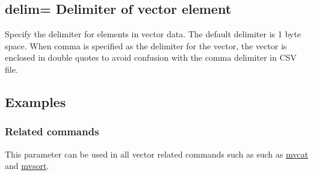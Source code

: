 %

\subsection{delim= Delimiter of vector element\label{sect:option_delim}}
Specify the delimiter for elements in vector data.
The default delimiter is 1 byte space.
When comma is specified as the delimiter for the vector, the vector is enclosed in double quotes to avoid confusion with the comma delimiter in CSV file. 

\subsection*{Examples}


\subsubsection*{Related commands}

This parameter can be used in all vector related commands such as such as \hyperref[sect:mvcat]{mvcat} and \hyperref[sect:mvsort]{mvsort}.

%

